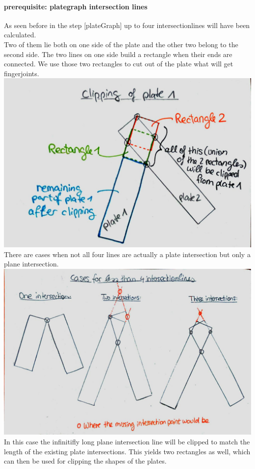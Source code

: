 \documentclass[../ClassicThesis.tex]{subfiles}
\begin{document}
\paragraph{prerequisite: plategraph intersection lines}
As seen before in the step [plateGraph] up to four intersectionlines will have been calculated.\\
Two of them lie both on one side of the plate and the other two belong to the second side. The two lines on one side build a rectangle when their ends are connected. We use those two rectangles to cut out of the plate what will get fingerjoints.\\
\includegraphics[width=\columnwidth]{Images/10-joints-clippingPlate.jpg}\\
There are cases when not all four lines are actually a plate intersection but only a plane intersection. \\
\includegraphics[width=\columnwidth]{Images/10-joints-casesOfLines.jpg}\\
In this case the infinitifly long plane intersection line will be clipped to match the length of the existing plate intersections. This yields two rectangles as well, which can then be used for clipping the shapes of the plates.
\end{document}
